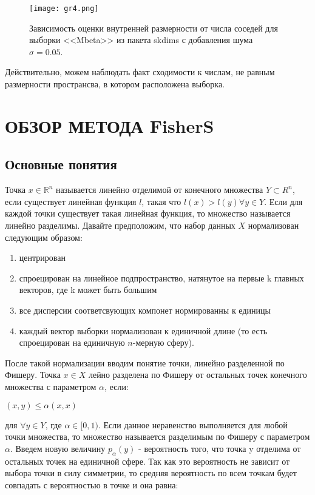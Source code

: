 \documentclass[english, russian]{sobraep}
\begin{document}
\begin{figure}[H]
	\texttt{[image: gr4.png]}
	\centering
	\caption{Зависимость оценки внутренней размерности от числа соседей для выборки <<Mbeta>> из пакета skdims с добавления шума $\sigma = 0.05$.}
	\label{fig:fig1}
\end{figure}

Действительно, можем наблюдать факт сходимости к числам, не равным размерности пространсва, в котором расположена выборка. 

\section{ОБЗОР МЕТОДА FisherS}

\subsection{Основные понятия}
Точка $x \in \mathbb {R}^n$ называется линейно отделимой от конечного множества $Y \subset {R}^n$, если существует линейная функция $l$, такая что $l(x) > l(y) \forall y \in Y$. Если для каждой точки существует такая линейная функция, то множество называется линейно разделимы.
Давайте предположим, что набор данных $X$ нормализован следующим образом: 
\begin{enumerate}
    \item центрирован
    \item спроецирован на линейное подпространство, натянутое на первые k главных векторов, где k может быть большим
    \item все дисперсии соответсвующих компонет нормированны к единицы 
    \item каждый вектор выборки нормализован к единичной длине (то есть спроецирован на единичную $n$-мерную сферу). 
\end{enumerate}
После такой нормализации вводим понятие точки, линейно разделенной по Фишеру. Точка $x \in X$ лейно разделена по Фишеру от остальных точек конечного множества с параметром $\alpha$, если: 
\begin{center}
    $(x,y) \leq \alpha(x,x)$
\end{center}
для $\forall y \in Y$, где $\alpha \in [0, 1)$. Если данное неравенство выполняется для любой точки множества, то множество называется разделимым по Фишеру с параметром $\alpha$. 
Введем новую величину $p_\alpha(y)$ - вероятность того, что точка y отделима от остальных точек на единичной сфере. Так как это вероятность не зависит от выбора точки в силу симметрии, то средняя вероятность по всем точкам будет совпадать с вероятностью в точке и она равна: 
\end{document}

